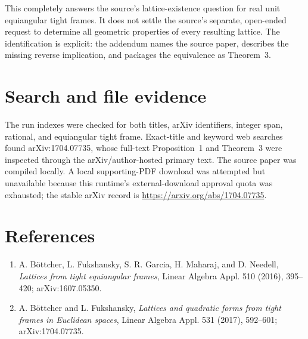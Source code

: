 \documentclass[11pt]{article}
\begin{document}
This completely answers the source's lattice-existence question for real
unit equiangular tight frames. It does not settle the source's separate,
open-ended request to determine all geometric properties of every resulting
lattice. The identification is explicit: the addendum names the source
paper, describes the missing reverse implication, and packages the
equivalence as Theorem~3.

\section*{Search and file evidence}

The run indexes were checked for both titles, arXiv identifiers, integer
span, rational, and equiangular tight frame. Exact-title and keyword web
searches found arXiv:1704.07735, whose full-text Proposition~1 and Theorem~3
were inspected through the arXiv/author-hosted primary text. The source paper
was compiled locally. A local supporting-PDF download was attempted but
unavailable because this runtime's external-download approval quota was
exhausted; the stable arXiv record is
\url{https://arxiv.org/abs/1704.07735}.

\section*{References}

\begin{enumerate}
\item A. Böttcher, L. Fukshansky, S. R. Garcia, H. Maharaj, and D. Needell,
\emph{Lattices from tight equiangular frames},
Linear Algebra Appl. 510 (2016), 395--420; arXiv:1607.05350.

\item A. Böttcher and L. Fukshansky,
\emph{Lattices and quadratic forms from tight frames in Euclidean spaces},
Linear Algebra Appl. 531 (2017), 592--601; arXiv:1704.07735.
\end{enumerate}
\end{document}
